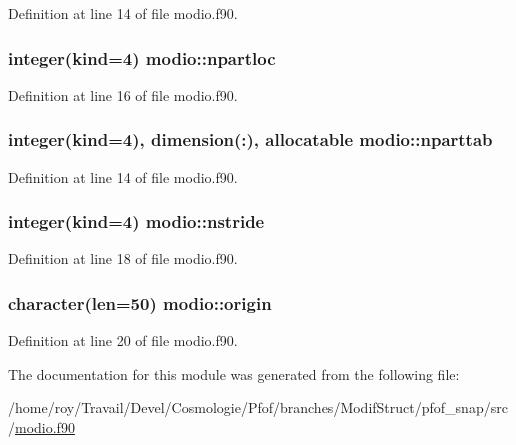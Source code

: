 Definition at line 14 of file modio.\-f90.

\hypertarget{classmodio_a0bf1df6ff1e675aabce26f3d7289a700}{
\subsubsection[{npartloc}]{\setlength{\rightskip}{0pt plus 5cm}integer(kind=4) modio\-::npartloc}}\label{classmodio_a0bf1df6ff1e675aabce26f3d7289a700}


Definition at line 16 of file modio.\-f90.

\hypertarget{classmodio_a4a7b05300378789a7f94a217ba703153}{
\subsubsection[{nparttab}]{\setlength{\rightskip}{0pt plus 5cm}integer(kind=4), dimension(\-:), allocatable modio\-::nparttab}}\label{classmodio_a4a7b05300378789a7f94a217ba703153}


Definition at line 14 of file modio.\-f90.

\hypertarget{classmodio_a6661d8a6f911c13b15cebca52e76b6fc}{
\subsubsection[{nstride}]{\setlength{\rightskip}{0pt plus 5cm}integer(kind=4) modio\-::nstride}}\label{classmodio_a6661d8a6f911c13b15cebca52e76b6fc}


Definition at line 18 of file modio.\-f90.

\hypertarget{classmodio_a12ada16137589f81ccc218e3b77f25c6}{
\subsubsection[{origin}]{\setlength{\rightskip}{0pt plus 5cm}character(len=50) modio\-::origin}}\label{classmodio_a12ada16137589f81ccc218e3b77f25c6}


Definition at line 20 of file modio.\-f90.



The documentation for this module was generated from the following file\-:\begin{DoxyCompactItemize}
\item 
/home/roy/\-Travail/\-Devel/\-Cosmologie/\-Pfof/branches/\-Modif\-Struct/pfof\-\_\-snap/src/\hyperlink{pfof__snap_2src_2modio_8f90}{modio.\-f90}\end{DoxyCompactItemize}
